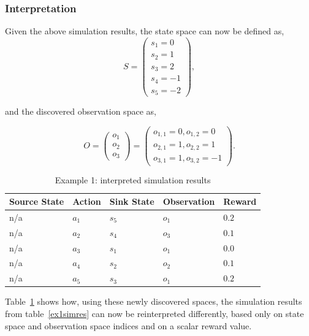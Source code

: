 \subsubsection{Interpretation}

Given the above simulation results, the state space can now be defined as,
\[
S = \begin{pmatrix}
s_1 = 0 \\
s_2 = 1 \\
s_3 = 2 \\
s_4 = -1 \\
s_5 = -2
\end{pmatrix},
\]

and the discovered observation space as,

\[
O = \begin{pmatrix}
o_1 \\
o_2 \\
o_3
\end{pmatrix}
= \begin{pmatrix}
o_{1,1} = 0, o_{1,2} = 0 \\
o_{2,1} = 1, o_{2,2} = 1 \\
o_{3,1} = 1, o_{3,2} = -1
\end{pmatrix}.
\]

\begin{table}
\begin{center}
    \begin{tabular}{ | l | l | l | l | l |}
    \hline
Source State & Action & Sink State & Observation & Reward \\ \hline
    n/a      & $a_1$  & $s_5$      & $o_1$       & $0.2$ \\ \hline
    n/a      & $a_2$  & $s_4$      & $o_3$       & $0.1$ \\ \hline
    n/a      & $a_3$  & $s_1$      & $o_1$       & $0.0$ \\ \hline
    n/a      & $a_4$  & $s_2$      & $o_2$       & $0.1$ \\ \hline
    n/a      & $a_5$  & $s_3$      & $o_1$       & $0.2$ \\ \hline
\end{tabular}
\caption{Example 1: interpreted simulation results}
\label{ex1simres2}
\end{center}
\end{table}

Table~\ref{ex1simres2} shows how, using these newly discovered spaces, the simulation results from table~\ref{ex1simres} can now be reinterpreted differently, based only on state space and observation space indices and on a scalar reward value.

